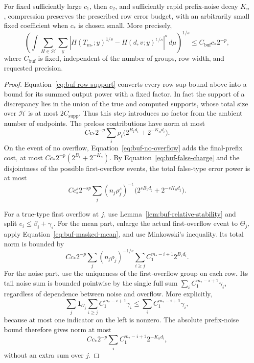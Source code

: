 \begin{proposition}
\label{prop:buf-error}
For fixed sufficiently large $c_1$, then $c_2$, and sufficiently rapid
prefix-noise decay $K_n$, compression preserves the prescribed row error
budget, with an arbitrarily small fixed coefficient when $c_*$ is chosen
small.  More precisely,
\begin{equation}
 \left(\int\sum_{H\in\mathcal H}\sum_y
  |H(T_{m_*};y)^{1/s}-H(d,v;y)^{1/s}|^s\,d\mu\right)^{1/s}
       \leq C_{\mathrm{buf}}c_*2^{-p},
 \label{eq:buf-integrated}
\end{equation}
where $C_{\mathrm{buf}}$ is fixed, independent of the number of groups,
row width, and requested precision.
\end{proposition}
\begin{proof}
Equation~\eqref{eq:buf-row-support} converts every row sup bound above
into a bound for its summed output power with a fixed factor.
In fact the support of a discrepancy lies in the union of the true and
computed supports, whose total size over $\mathcal H$ is at most
$2C_{\mathrm{supp}}$.  Thus this step introduces no factor from the
ambient number of endpoints.
The preloss contributions have norm at most
\[
 Cc_*2^{-p}\sum_i\rho_i
             \bigl(2^{B_1d_i}+2^{-K_nd_i}\bigr).
\]
On the event of no overflow, Equation~\eqref{eq:buf-no-overflow} adds the
final-prefix cost, at most $Cc_*2^{-p}(2^{B_1}+2^{-K_n})$.
By Equation~\eqref{eq:buf-false-charge} and the disjointness of the
possible first-overflow events, the total false-type error power is at
most
\begin{equation}
 Cc_*^s2^{-sp}\sum_j
       (n_j\rho_j^s)^{-1}
       \bigl(2^{sB_1d_j}+2^{-sK_nd_j}\bigr).
 \label{eq:buf-false-sum}
\end{equation}

For a true-type first overflow at $j$, use
Lemma~\ref{lem:buf-relative-stability} and split $e_i\leq\beta_i+\gamma_i$.
For the mean part, enlarge the actual first-overflow event to $\Theta_j$,
apply Equation~\eqref{eq:buf-masked-mean}, and use Minkowski's inequality.
Its total norm is bounded by
\begin{equation}
 Cc_*2^{-p}\sum_j(n_j\rho_j)^{-1/s}
       \sum_{i\geq j}C_1^{m_*-i+1}2^{B_1d_i}.
 \label{eq:buf-true-sum}
\end{equation}
For the noise part, use the uniqueness of the first-overflow group on
each row.  Its tail noise sum is bounded pointwise by the single full
sum $\sum_iC_1^{m_*-i+1}\gamma_i$, regardless of dependence between
noise and overflow.  More explicitly,
\[
 \sum_j\mathbf1_{\mathcal O_j}
       \sum_{i\geq j}C_1^{m_*-i+1}\gamma_i
 \leq\sum_i C_1^{m_*-i+1}\gamma_i,
\]
because at most one indicator on the left is nonzero.  The absolute
prefix-noise bound therefore gives
norm at most
\begin{equation}
 Cc_*2^{-p}\sum_iC_1^{m_*-i+1}2^{-K_nd_i},
 \label{eq:buf-noise-sum}
\end{equation}
without an extra sum over $j$.


\end{proof}
